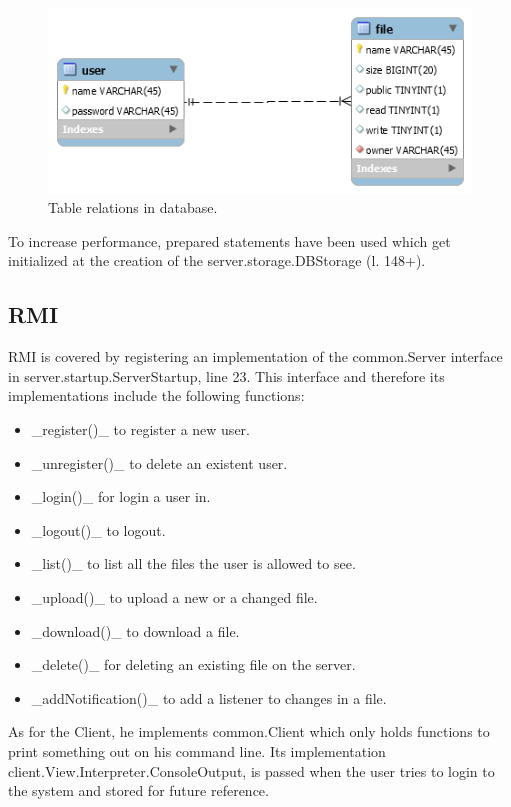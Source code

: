 \documentclass[a4paper]{scrartcl}
\begin{document}
\begin{figure}[h!]
  \begin{center}
    \includegraphics[scale=0.8]{db.png}
    \caption{Table relations in database.}
    \label{fig:database}
  \end{center}
\end{figure}

To increase performance, prepared statements have been used which get initialized at the creation of the server.storage.DBStorage (l. 148+).


\subsection{RMI}

RMI is covered by registering an implementation of the common.Server interface in server.startup.ServerStartup, line 23.
This interface and therefore its implementations include the following functions:
\begin{itemize}
    \item _register()_ to register a new user.
    \item _unregister()_ to delete an existent user.
    \item _login()_ for login a user in.
    \item _logout()_ to logout.
    \item _list()_ to list all the files the user is allowed to see.
    \item _upload()_ to upload a new or a changed file.
    \item _download()_ to download a file.
    \item _delete()_ for deleting an existing file on the server.
    \item _addNotification()_ to add a listener to changes in a file.
\end{itemize}

As for the Client, he implements common.Client which only holds functions to print something out on his command line.
Its implementation client.View.Interpreter.ConsoleOutput, is passed when the user tries to login to the system and stored for future reference.
\end{document}
